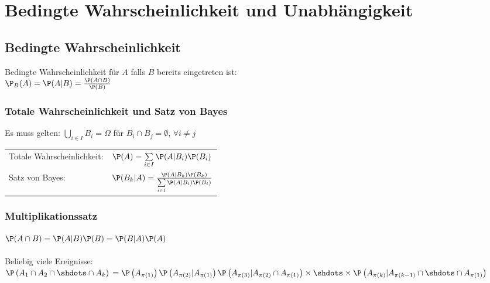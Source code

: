 \documentclass[german,color,6pt]{latex4ei/latex4ei_sheet}
\begin{document}
\section{Bedingte Wahrscheinlichkeit und \newline Unabhängigkeit}
\begin{sectionbox}
	\subsection{Bedingte Wahrscheinlichkeit}
	Bedingte Wahrscheinlichkeit für $A$ falls $B$ bereits eingetreten ist:\\
	$\P_B(A) = \P(A|B) = \frac{\P(A \cap B)}{\P(B)}$\\ %
	
	\subsubsection{Totale Wahrscheinlichkeit und Satz von Bayes}
	Es muss gelten: $\bigcup\limits_{i \in I} B_i = \Omega$ für $B_i \cap B_j = \emptyset$, $\forall i \neq j$ \\
	\begin{tabular}{ll}
		Totale Wahrscheinlichkeit: & $\P(A) = \sum\limits_{i \in I} \P(A|B_i)\P(B_i)$\\
		Satz von Bayes: & $\P(B_k | A) = \frac{\P(A | B_k)\P(B_k)}{\sum\limits_{i \in I} \P(A|B_i) \P(B_i)}$\\
	\end{tabular}

	
	\subsubsection{Multiplikationssatz}
	$\P(A \cap B) = \P(A|B)\P(B) = \P(B|A)\P(A)$
	\\ \\ 
	Beliebig viele Ereignisse:\\
	$\P\left(A_1 \cap A_2 \cap \shdots \cap A_k\right) \newline
	= \P\left(A_{\pi(1)}\right)\P\left(A_{\pi(2)}|A_{\pi(1)}\right)\P\left(A_{\pi(3)}|A_{\pi(2)} \cap A_{\pi(1)}\right) \times \newline
	\shdots \times \P\left(A_{\pi(k)}|A_{\pi(k-1)} \cap \shdots \cap A_{\pi(1)}\right)$
\end{sectionbox}
\end{document}
